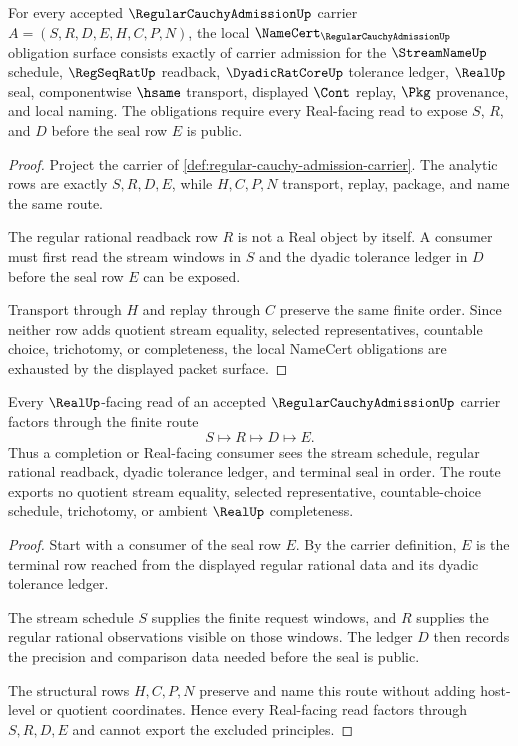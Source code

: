 \begin{theorem}
\label{thm:regular-cauchy-admission-namecert-obligations}
For every accepted $\RegularCauchyAdmissionUp$ carrier $A=(S,R,D,E,H,C,P,N)$, the local $\NameCert_{\RegularCauchyAdmissionUp}$ obligation surface consists exactly of carrier admission for the $\StreamNameUp$ schedule, $\RegSeqRatUp$ readback, $\DyadicRatCoreUp$ tolerance ledger, $\RealUp$ seal, componentwise $\hsame$ transport, displayed $\Cont$ replay, $\Pkg$ provenance, and local naming. The obligations require every Real-facing read to expose $S$, $R$, and $D$ before the seal row $E$ is public.
\end{theorem}
\begin{proof}
Project the carrier of \autoref{def:regular-cauchy-admission-carrier}. The analytic rows are exactly $S,R,D,E$, while $H,C,P,N$ transport, replay, package, and name the same route.

The regular rational readback row $R$ is not a Real object by itself. A consumer must first read the stream windows in $S$ and the dyadic tolerance ledger in $D$ before the seal row $E$ can be exposed.

Transport through $H$ and replay through $C$ preserve the same finite order. Since neither row adds quotient stream equality, selected representatives, countable choice, trichotomy, or completeness, the local NameCert obligations are exhausted by the displayed packet surface.
\end{proof}

\begin{theorem}
\label{thm:regular-cauchy-admission-real-seal-route}
Every $\RealUp$-facing read of an accepted $\RegularCauchyAdmissionUp$ carrier factors through the finite route
$$
S \longmapsto R \longmapsto D \longmapsto E .
$$
Thus a completion or Real-facing consumer sees the stream schedule, regular rational readback, dyadic tolerance ledger, and terminal seal in order. The route exports no quotient stream equality, selected representative, countable-choice schedule, trichotomy, or ambient $\RealUp$ completeness.
\end{theorem}
\begin{proof}
Start with a consumer of the seal row $E$. By the carrier definition, $E$ is the terminal row reached from the displayed regular rational data and its dyadic tolerance ledger.

The stream schedule $S$ supplies the finite request windows, and $R$ supplies the regular rational observations visible on those windows. The ledger $D$ then records the precision and comparison data needed before the seal is public.

The structural rows $H,C,P,N$ preserve and name this route without adding host-level or quotient coordinates. Hence every Real-facing read factors through $S,R,D,E$ and cannot export the excluded principles.
\end{proof}

